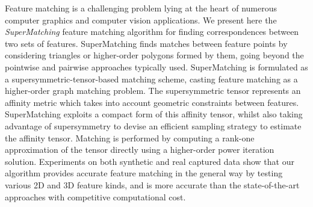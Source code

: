 Feature matching is a challenging problem lying at the heart of numerous computer graphics and computer vision applications.
We present here the \emph{SuperMatching} feature matching algorithm for finding correspondences between two sets of features.
SuperMatching finds matches between feature points by considering triangles or higher-order polygons formed by them, going beyond the pointwise and pairwise approaches typically used.
SuperMatching is formulated as a supersymmetric-tensor-based matching scheme,
casting feature matching as a higher-order graph matching problem.
The supersymmetric tensor represents an affinity metric which takes into account geometric constraints between features.
SuperMatching exploits a compact form of this affinity tensor,
whilst also taking advantage of supersymmetry to devise an
efficient sampling strategy to estimate the affinity tensor.
Matching is performed by computing a rank-one approximation of the tensor directly
using a higher-order power iteration solution.
Experiments on both synthetic and real captured data show that
our algorithm provides accurate feature matching in the general way by testing various 2D and 3D feature kinds,
and is more accurate than the state-of-the-art approaches with competitive computational cost.
